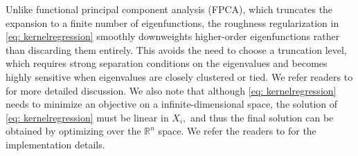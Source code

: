 \documentclass[mnsc]{informs3aa} %
\newcommand{\RR}{\mathbb{R}}
\begin{document}
Unlike functional principal component analysis (FPCA), which truncates the expansion to a finite number of eigenfunctions, the roughness regularization in \eqref{eq: kernelregression} smoothly downweights higher-order eigenfunctions rather than discarding them entirely. This avoids the need to choose a truncation level, which requires strong separation conditions on the eigenvalues and becomes highly sensitive when eigenvalues are closely clustered or tied. We refer readers to \cite{cai2006prediction,cai2012minimax} for more detailed discussion.
We also note that although \eqref{eq: kernelregression} needs to minimize an objective on a infinite-dimensional space, the solution of \eqref{eq: kernelregression} must be linear in $X_i,$ and thus the final solution can be obtained by optimizing over the $\RR^n$ space. We refer the readers to \cite{YuanCai2010RKHSFLR} for the implementation details.
\end{document}
